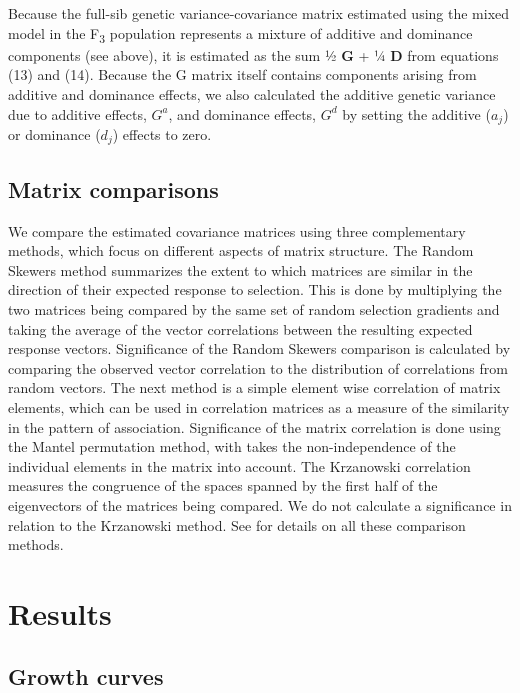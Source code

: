 \begin{refsection}
Because the full-sib genetic variance-covariance matrix estimated using
the mixed model in the F\textsubscript{3} population represents a
mixture of additive and dominance components (see above), it is
estimated as the sum ½ \textbf{G} + ¼ \textbf{D} from equations (13)
and (14). Because the G matrix itself contains components arising from
additive and dominance effects, we also calculated the additive genetic
variance due to additive effects, \(G^{a}\), and dominance effects,
\(G^{d}\) by setting the additive (\(a_{j}\)) or dominance (\(d_{j}\))
effects to zero.

\subsection{Matrix comparisons}

We compare the estimated covariance matrices using three complementary
methods, which focus on different aspects of matrix structure. The
Random Skewers method \parencite{Cheverud2007-yp} summarizes the extent to which matrices are
similar in the direction of their expected response to selection. This is done by
multiplying the two matrices being compared by the same set of random
selection gradients and taking the average of the vector correlations
between the resulting expected response vectors. Significance of the
Random Skewers comparison is calculated by comparing the observed vector
correlation to the distribution of correlations from random vectors. The
next method is a simple element wise correlation of matrix elements,
which can be used in correlation matrices as a measure of the similarity
in the pattern of association. Significance of the matrix correlation is
done using the Mantel permutation method, with takes the
non-independence of the individual elements in the matrix into account.
The Krzanowski correlation measures the congruence of the spaces spanned
by the first half of the eigenvectors of the matrices being compared. We
do not calculate a significance in relation to the Krzanowski method.
See \parencite{Melo2015-kf} for details on all these comparison methods.

\section{Results}

\subsection{Growth curves}


\end{refsection}
